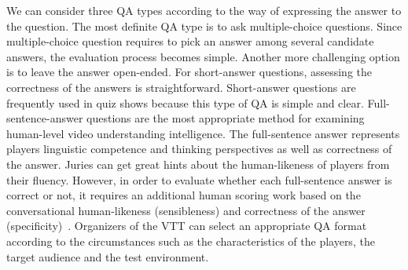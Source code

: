 \documentclass[letterpaper]{article} %
\begin{document}
We can consider three QA types according to the way of expressing the answer to the question. The most definite QA type is to ask multiple-choice questions. Since multiple-choice question requires to pick an answer among several candidate answers, the evaluation process becomes simple.
Another more challenging option is to leave the answer open-ended. For short-answer questions, assessing the correctness of the answers is straightforward. Short-answer questions are frequently used in quiz shows because this type of QA is simple and clear. Full-sentence-answer questions are the most appropriate method for examining human-level video understanding intelligence. The full-sentence answer represents players linguistic competence and thinking perspectives as well as correctness of the answer. Juries can get great hints about the human-likeness of players from their fluency. However, in order to evaluate whether each full-sentence answer is correct or not, it requires an additional human scoring work based on the conversational human-likeness (sensibleness) and correctness of the answer (specificity)~\cite{adiwardana2020meena}.
Organizers of the VTT can select an appropriate QA format according to the circumstances such as the characteristics of the players, the target audience and the test environment.
\end{document}
